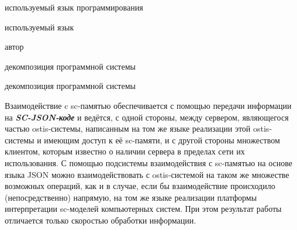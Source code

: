 \begin{scnitemize}
\begin{SCn}
\begin{scnrelfromlist}{используемый язык программирования}
\end{scnrelfromlist}
\begin{scnrelfromlist}{используемый язык}
\end{scnrelfromlist}
\begin{scnindent}
	\begin{scnrelfromlist}{автор}
	\end{scnrelfromlist}
	\begin{scnrelfromset}{декомпозиция программной системы}
		\begin{scnindent}
			\begin{scnrelfromset}{декомпозиция программной системы}
			\end{scnrelfromset}
		\end{scnindent}
    \end{scnrelfromset}
\end{scnindent}
\end{SCn}

Взаимодействие c sc-памятью обеспечивается с помощью передачи информации на \textit{\textbf{SC-JSON-коде}} и ведётся,
с одной стороны, между сервером, являющегося частью ostis-системы, написанным на том же языке реализации этой ostis-
системы и имеющим доступ к её sc-памяти, и с другой стороны множеством клиентом, которым известно о наличии сервера
в пределах сети их использования. С помощью подсистемы взаимодействия с sc-памятью на основе языка JSON можно
взаимодействовать с ostis-системой на таком же множестве возможных операций, как и в случае, если бы взаимодействие
происходило (непосредственно) напрямую, на том же языке реализации платформы интерпретации sc-моделей компьютерных
систем. При этом результат работы отличается только скоростью обработки информации.


\end{scnitemize}
